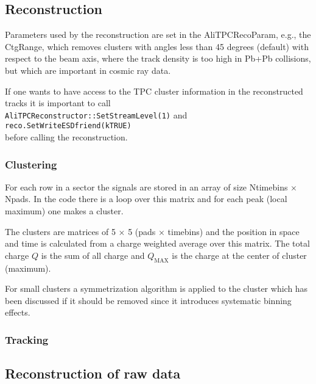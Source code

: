 \documentclass[a4paper,12pt]{article}
\begin{document}
\subsection{Reconstruction}

Parameters used by the reconstruction are set in the AliTPCRecoParam,
e.g., the CtgRange, which removes clusters with angles less than 45
degrees (default) with respect to the beam axis, where the track
density is too high in Pb+Pb collisions, but which are important in
cosmic ray data.

If one wants to have access to the TPC cluster information in the
reconstructed tracks it is important to call\\
\texttt{AliTPCReconstructor::SetStreamLevel(1)} and\\
\texttt{reco.SetWriteESDfriend(kTRUE)}\\
before calling the reconstruction.

\subsubsection{Clustering}

For each row in a sector the signals are stored in an array of size
Ntimebins $\times$ Npads. In the code there is a loop over this matrix
and for each peak (local maximum) one makes a cluster.

The clusters are matrices of 5 $\times$ 5 (pads $\times$ timebins) and
the position in space and time is calculated from a charge weighted
average over this matrix. The total charge $Q$ is the sum of all
charge and $Q_{\text{MAX}}$ is the charge at the center of cluster
(maximum).

For small clusters a symmetrization algorithm is applied to the cluster
which has been discussed if it should be removed since it introduces
systematic binning effects.

\subsubsection{Tracking}



\subsection{Reconstruction of raw data}

\end{document}
